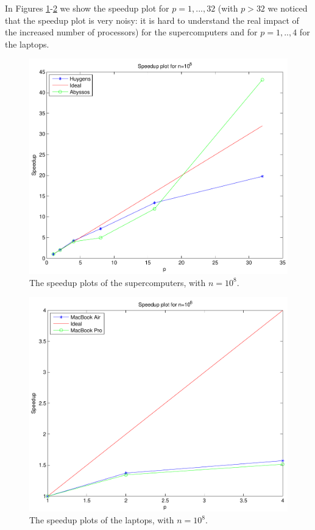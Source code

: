 \documentclass[a4paper,11pt]{article}
\begin{document}
In Figures \ref{sp1e8}-\ref{sp1e8m} we show the speedup plot for $p=1,...,32$ (with $p>32$ we noticed that the speedup plot is very noisy: it is hard to understand the real impact of the increased number of processors) for the supercomputers and for $p=1,..,4$ for the laptops.

\begin{figure}[H]
\begin{center}
\includegraphics[scale=0.6]{img/sp1e8}
\end{center}
\caption{The speedup plots of the supercomputers, with $n=10^8$.} \label{sp1e8}
\end{figure}

\begin{figure}[H]
\begin{center}
\includegraphics[scale=0.6]{img/sp1e8m}
\end{center}
\caption{The speedup plots of the laptops, with $n=10^8$.} \label{sp1e8m}
\end{figure}
\end{document}
